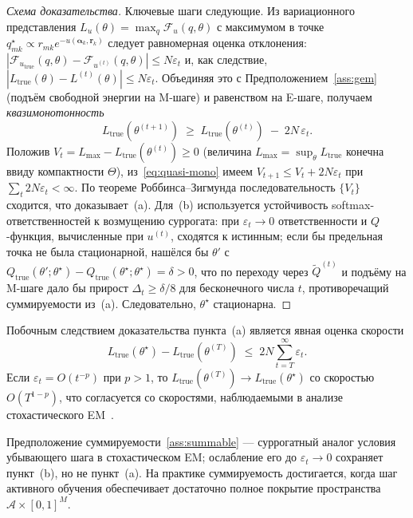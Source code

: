 \begin{proof}[Схема доказательства]
Ключевые шаги следующие. Из вариационного представления
$L_u(\theta) = \max_q \mathcal{F}_u(q, \theta)$ с максимумом в точке
$q^{\star}_{mk} \propto r_{mk} e^{-u(\boldsymbol{\alpha}_k, \mathbf{r}_k)}$
следует равномерная оценка отклонения:
$|\mathcal{F}_{u_{\mathrm{true}}}(q,\theta) - \mathcal{F}_{u^{(t)}}(q,\theta)|
\leq N\varepsilon_t$ и, как следствие,
$|L_{\mathrm{true}}(\theta) - L^{(t)}(\theta)| \leq N\varepsilon_t$.
Объединяя это с Предположением~\ref{ass:gem} (подъём свободной энергии на
M-шаге) и равенством на E-шаге, получаем
\emph{квазимонотонность}
\begin{equation}
\label{eq:quasi-mono}
L_{\mathrm{true}}(\theta^{(t+1)}) \;\geq\;
L_{\mathrm{true}}(\theta^{(t)}) \;-\; 2N\,\varepsilon_t.
\end{equation}
Положив $V_t = L_{\max} - L_{\mathrm{true}}(\theta^{(t)}) \geq 0$
(величина $L_{\max} = \sup_\theta L_{\mathrm{true}}$ конечна ввиду
компактности $\Theta$), из~\eqref{eq:quasi-mono} имеем
$V_{t+1} \leq V_t + 2N\varepsilon_t$ при
$\sum_t 2N\varepsilon_t < \infty$. По теореме Роббинса--Зигмунда
\cite{robbins1971convergence} последовательность $\{V_t\}$ сходится, что
доказывает~(a). Для~(b) используется устойчивость softmax-ответственностей
к возмущению суррогата: при $\varepsilon_t \to 0$ ответственности и
$Q$-функция, вычисленные при $u^{(t)}$, сходятся к истинным; если бы
предельная точка не была стационарной, нашёлся бы $\theta'$ с
$Q_{\mathrm{true}}(\theta';\theta^{\star}) -
Q_{\mathrm{true}}(\theta^{\star};\theta^{\star}) = \delta > 0$, что по
переходу через $\tilde Q^{(t)}$ и подъёму на M-шаге дало бы прирост
$\Delta_t \geq \delta/8$ для бесконечного числа $t$, противоречащий
суммируемости из~(a). Следовательно, $\theta^{\star}$ стационарна.
\end{proof}

Побочным следствием доказательства пункта~(a) является явная оценка
скорости
\[
L_{\mathrm{true}}(\theta^{\star}) - L_{\mathrm{true}}(\theta^{(T)})
\;\leq\; 2N \sum_{t = T}^{\infty} \varepsilon_t.
\]
Если $\varepsilon_t = O(t^{-p})$ при $p > 1$, то
$L_{\mathrm{true}}(\theta^{(T)}) \to L_{\mathrm{true}}(\theta^{\star})$
со скоростью $O(T^{1 - p})$, что согласуется со скоростями,
наблюдаемыми в анализе стохастического EM~\cite{cappe2009online}.

\begin{remark}
Предположение суммируемости~\ref{ass:summable} --- суррогатный аналог
условия убывающего шага в стохастическом EM; ослабление его до
$\varepsilon_t \to 0$ сохраняет пункт~(b), но не пункт~(a). На практике
суммируемость достигается, когда шаг активного обучения обеспечивает
достаточно полное покрытие пространства
$\mathcal{A}\times[0,1]^M$.
\end{remark}

